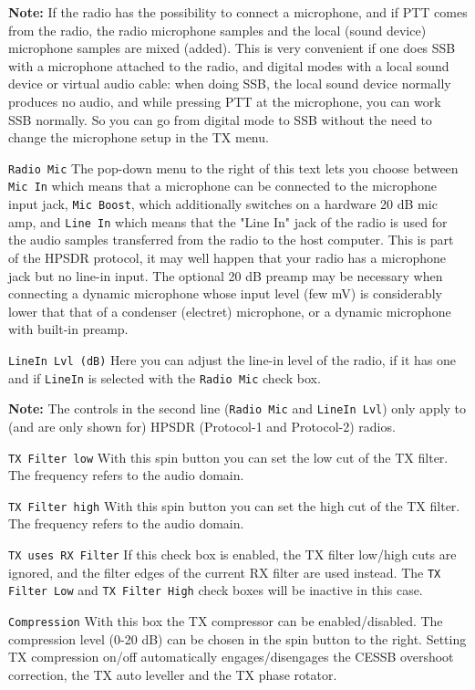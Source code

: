 \documentclass[12pt]{book}
\def\rett#1{\texttt{\color{red}#1}}
\begin{document}
\textbf{Note:} If the radio has the possibility
to connect a microphone, and if PTT comes from the radio, the radio microphone samples
and the local (sound device) microphone samples are mixed (added). This is very convenient
if one does SSB with a microphone attached to the radio, and digital modes with a
local sound device or virtual audio cable: when doing SSB, the local sound device normally
produces no audio, and while pressing PTT at the microphone, you can work SSB normally.
So you can go from digital mode to SSB without the need to change the microphone setup
in the TX menu.

\rett{Radio Mic} The pop-down menu to the right of this text
lets you choose between \rett{Mic In} which means
that a microphone can be connected to the microphone input jack, \rett{Mic Boost}, which
additionally switches on a hardware 20 dB mic amp, and \rett{Line In} which means that the
"Line In" jack of the radio is used for the audio samples transferred from the radio to the
host computer. This is part of the HPSDR protocol, it may well happen that your radio has a
microphone jack but no line-in input. The optional 20 dB preamp may be necessary when connecting
a dynamic microphone whose input level (few mV) is considerably lower that that of a
condenser (electret) microphone, or a dynamic microphone with built-in preamp.

\rett{LineIn Lvl (dB)} Here you can adjust the line-in level of the radio, if it
has one and if \rett{LineIn} is selected with the \rett{Radio Mic} check box.

\textbf{Note:} The controls in the second line (\rett{Radio Mic} and \rett{LineIn Lvl}) only
apply to (and are only
shown for) HPSDR (Protocol-1 and Protocol-2) radios.

\rett{TX Filter low} With this spin button you can set the low cut of the TX filter. The
frequency refers to the audio domain.

\rett{TX Filter high} With this spin button you can set the high cut of the TX filter. The
frequency refers to the audio domain.

\rett{TX uses RX Filter} If this check box is enabled, the TX filter low/high cuts are ignored,
and the filter edges of the current RX filter are used instead. The \rett{TX Filter Low}
and \rett{TX Filter High} check boxes will be inactive in this case.

\rett{Compression} With this box the TX compressor can be enabled/disabled.
The compression level (0-20 dB) can be chosen in the spin button to the right.
Setting TX compression on/off automatically engages/disengages the CESSB overshoot
correction, the TX auto leveller and the TX phase rotator.
\end{document}
